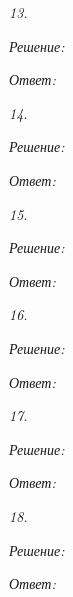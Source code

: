\newpage %

\emph{13. }

\vspace*{2em}
\emph{Решение:}

\vspace*{2em}
\emph{Ответ: }

\newpage %

\emph{14. }

\vspace*{2em}
\emph{Решение:}

\vspace*{2em}
\emph{Ответ: }

\newpage %

\emph{15. }

\vspace*{2em}
\emph{Решение:}

\vspace*{2em}
\emph{Ответ: }

\newpage %

\emph{16. }

\vspace*{2em}
\emph{Решение:}

\vspace*{2em}
\emph{Ответ: }

\newpage %

\emph{17. }

\vspace*{2em}
\emph{Решение:}

\vspace*{2em}
\emph{Ответ: }

\newpage %

\emph{18. }

\vspace*{2em}
\emph{Решение:}

\vspace*{2em}
\emph{Ответ: }



